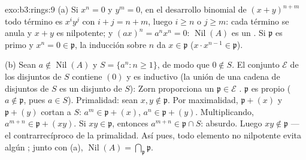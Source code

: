 \begin{solution}{exo:b3:rings:9}
(a) Si $x^n = 0$ y $y^m = 0$, en el desarrollo binomial de $(x+y)^{n+m}$
todo término es $x^iy^j$ con $i + j = n + m$, luego $i
\geq n$ o $j \geq m$: cada término se anula y $x + y$ es nilpotente; y
$(ax)^n = a^nx^n = 0$: $\operatorname{Nil}(A)$ es un
. Si $\mathfrak p$ es primo y
$x^n = 0 \in \mathfrak p$, la inducción sobre $n$ da $x \in \mathfrak p$
($x \cdot x^{n-1} \in
\mathfrak p$).

(b) Sean $a \notin \operatorname{Nil}(A)$ y $S = \{a^n : n \geq
1\}$, de modo que $0 \notin S$. El conjunto $\mathcal E$ de los
 disjuntos de $S$ contiene $(0)$ y
es inductivo (la unión de una cadena de
 disjuntos de $S$ es un
 disjunto de $S$): Zorn proporciona un
$\mathfrak p \in \mathcal E$
. $\mathfrak p$ es propio
($a \notin \mathfrak p$, pues $a \in S$). Primalidad: sean
$x, y \notin \mathfrak p$. Por maximalidad, $\mathfrak p + (x)$ y
$\mathfrak p + (y)$ cortan a $S$: $a^m \in \mathfrak p + (x)$, $a^n
\in \mathfrak p + (y)$. Multiplicando, $a^{m+n} \in \mathfrak p +
(xy)$. Si $xy \in \mathfrak p$, entonces $a^{m+n} \in \mathfrak p \cap
S$: absurdo. Luego $xy \notin \mathfrak p$ --- el contrarrecíproco de la
primalidad. Así pues, todo elemento no nilpotente evita algún
; junto con (a),
$\operatorname{Nil}(A) = \bigcap_{\mathfrak p} \mathfrak p$.
\end{solution}

